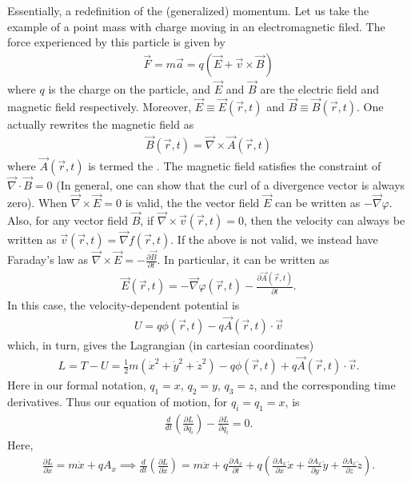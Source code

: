 Essentially, a redefinition of the (generalized) momentum. Let us take the example of a point mass with charge moving in an electromagnetic filed. The force experienced by this particle is given by
\begin{align}
    \vec{F} = m\vec{a} = q(\vec{E} + \vec{v} \times \vec{B})
\end{align}
where $q$ is the charge on the particle, and $\vec{E}$ and $\vec{B}$ are the electric field and magnetic field respectively. Moreover, $\vec{E} \equiv \vec{E}(\vec{r},t)$ and $\vec{B} \equiv \vec{B}(\vec{r},t)$. One actually rewrites the magnetic field as
\begin{align}
    \vec{B}(\vec{r},t) = \vec{\nabla} \times \vec{A}(\vec{r},t)
\end{align}
where $\vec{A}(\vec{r},t)$ is termed the . The magnetic field satisfies the constraint of $\vec{\nabla} \cdot \vec{B} = 0$ (In general, one can show that the curl of a divergence vector is always zero). When $\vec{\nabla} \times \vec{E} = 0$ is valid, the the vector field $\vec{E}$ can be written as $-\vec{\nabla} \varphi$. Also, for any vector field $\vec{B}$, if $\vec{\nabla} \times \vec{v}(\vec{r},t) = 0$, then the velocity can always be written as $\vec{v}(\vec{r},t) = \vec{\nabla}f(\vec{r},t)$. If the above is not valid, we instead have Faraday's law as $\vec{\nabla} \times \vec{E} = -\frac{\partial \vec{B}}{\partial t}$. In particular, it can be written as
\begin{align}
    \vec{E}(\vec{r},t) = -\vec{\nabla} \varphi(\vec{r},t) - \frac{\partial \vec{A}(\vec{r},t)}{\partial t}.
\end{align}
In this case, the velocity-dependent potential is
\begin{align}
    U = q \phi(\vec{r},t) - q\vec{A}(\vec{r},t) \cdot \vec{v}
\end{align}
which, in turn, gives the Lagrangian (in cartesian coordinates)
\begin{align}
    L = T - U = \frac{1}{2} m(\dot{x}^{2}+\dot{y}^{2}+\dot{z}^{2})-q\phi(\vec{r},t) + q\vec{A}(\vec{r},t) \cdot \vec{v}.
\end{align}
Here in our formal notation, $q_{1} = x$, $q_{2} = y$, $q_{3} = z$, and the corresponding time derivatives. Thus our equation of motion, for $q_{i} = q_{1} = x$, is
\begin{align}
    \frac{d}{dt} \left( \frac{\partial L}{\partial \dot{q}_{i}} \right) - \frac{\partial L}{\partial q_{i}} = 0.
\end{align}
Here,
\begin{align}
    \frac{\partial L}{\partial \dot{x}} = m\dot{x} + qA_{x} \implies \frac{d}{dt} \left( \frac{\partial L}{\partial \dot{x}} \right) = m\ddot{x} + q \frac{\partial A_{x}}{\partial t} + q \left( \frac{\partial A_{x}}{\partial x} \dot{x} + \frac{\partial A_{x}}{\partial y} \dot{y} + \frac{\partial A_{x}}{\partial z} \dot{z} \right).
\end{align}
